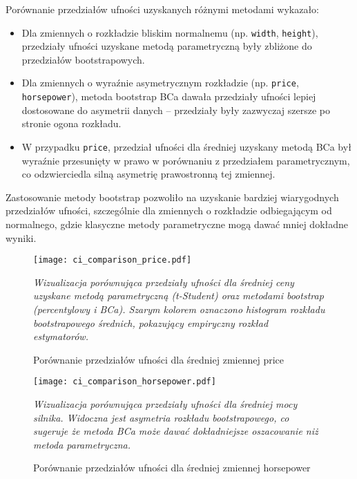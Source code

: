 \documentclass[12pt,a4paper]{article}
\begin{document}
Porównanie przedziałów ufności uzyskanych różnymi metodami wykazało:

\begin{itemize}
    \item Dla zmiennych o rozkładzie bliskim normalnemu (np. \texttt{width}, \texttt{height}), przedziały ufności uzyskane metodą parametryczną były zbliżone do przedziałów bootstrapowych.
    
    \item Dla zmiennych o wyraźnie asymetrycznym rozkładzie (np. \texttt{price}, \texttt{horsepower}), metoda bootstrap BCa dawała przedziały ufności lepiej dostosowane do asymetrii danych – przedziały były zazwyczaj szersze po stronie ogona rozkładu.
    
    \item W przypadku \texttt{price}, przedział ufności dla średniej uzyskany metodą BCa był wyraźnie przesunięty w prawo w porównaniu z przedziałem parametrycznym, co odzwierciedla silną asymetrię prawostronną tej zmiennej.
\end{itemize}

Zastosowanie metody bootstrap pozwoliło na uzyskanie bardziej wiarygodnych przedziałów ufności, szczególnie dla zmiennych o rozkładzie odbiegającym od normalnego, gdzie klasyczne metody parametryczne mogą dawać mniej dokładne wyniki.

\begin{figure}[H]
    \centering
    \texttt{[image: ci\_comparison\_price.pdf]}
    \caption{Porównanie przedziałów ufności dla średniej zmiennej price}
    \label{fig:ci_comparison_price}
    \small\textit{Wizualizacja porównująca przedziały ufności dla średniej ceny uzyskane metodą parametryczną (t-Student) oraz metodami bootstrap (percentylowy i BCa). Szarym kolorem oznaczono histogram rozkładu bootstrapowego średnich, pokazujący empiryczny rozkład estymatorów.}
\end{figure}

\begin{figure}[H]
    \centering
    \texttt{[image: ci\_comparison\_horsepower.pdf]}
    \caption{Porównanie przedziałów ufności dla średniej zmiennej horsepower}
    \label{fig:ci_comparison_horsepower}
    \small\textit{Wizualizacja porównująca przedziały ufności dla średniej mocy silnika. Widoczna jest asymetria rozkładu bootstrapowego, co sugeruje że metoda BCa może dawać dokładniejsze oszacowanie niż metoda parametryczna.}
\end{figure}
\end{document}
